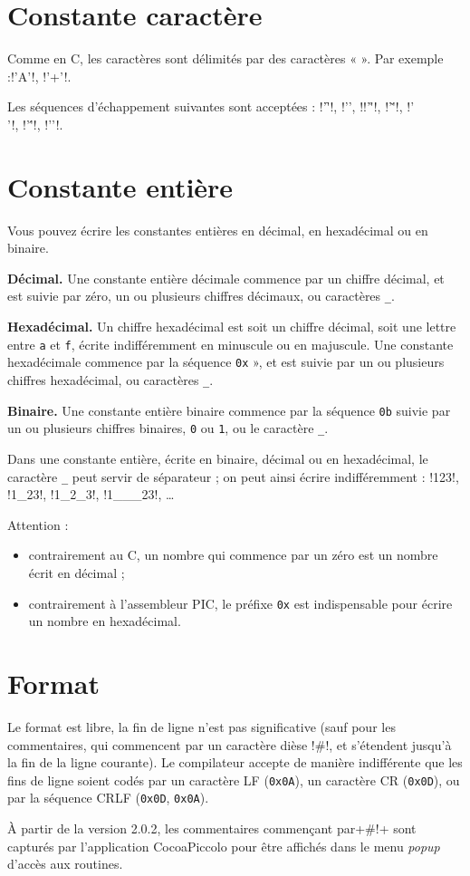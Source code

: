\section{Constante caractère}

Comme en C, les caractères sont délimités par des caractères « \texttt{\textquotesingle} ». Par exemple :\pic!'A'!, \pic!'+'!.


Les séquences d’échappement suivantes sont acceptées : \pic!'\f'!, \pic!'\n', !\pic!'\r'!, \pic!'\v'!, \pic!'\\'!, \pic!'\''!, \pic!'\0'!.

\section{Constante entière}

Vous pouvez écrire les constantes entières en décimal, en hexadécimal ou en binaire. 

\textbf{Décimal.} Une constante entière décimale commence par un chiffre décimal, et est suivie par zéro, un ou plusieurs chiffres décimaux, ou caractères \texttt{\_}.

\textbf{Hexadécimal.} Un chiffre hexadécimal est soit un chiffre décimal, soit une lettre entre \texttt{a} et \texttt{f}, écrite indifféremment en minuscule ou en majuscule. Une constante hexadécimale commence par la séquence \texttt{0x} », et est suivie par un ou plusieurs chiffres hexadécimal, ou caractères \texttt{\_}.

\textbf{Binaire.} Une constante entière binaire commence par la séquence \texttt{0b} suivie par un ou plusieurs chiffres binaires, \texttt{0} ou \texttt{1}, ou le caractère \texttt{\_}.

Dans une constante entière, écrite en binaire, décimal ou en hexadécimal, le caractère \texttt{\_} peut servir de séparateur ; on peut ainsi écrire indifféremment : \pic!123!, \pic!1_23!, \pic!1_2_3!, \pic!1___23!, \dots

Attention :
\begin{itemize}
  \item contrairement au C, un nombre qui commence par un zéro est un nombre écrit en décimal ;
  \item contrairement à l’assembleur PIC, le préfixe \texttt{0x} est indispensable pour écrire un nombre en hexadécimal.
\end{itemize}

\section{Format}

Le format est libre, la fin de ligne n’est pas significative (sauf pour les commentaires, qui commencent par un caractère dièse \pic!#!, et s’étendent jusqu’à la fin de la ligne courante). Le compilateur accepte de manière indifférente que les fins de ligne soient codés par un caractère LF (\texttt{0x0A}), un caractère CR (\texttt{0x0D}), ou par la séquence CRLF (\texttt{0x0D}, \texttt{0x0A}).

À partir de la version 2.0.2, les commentaires commençant par\pic+#!+ sont capturés par l'application CocoaPiccolo pour être affichés dans le menu \emph{popup} d'accès aux routines.

